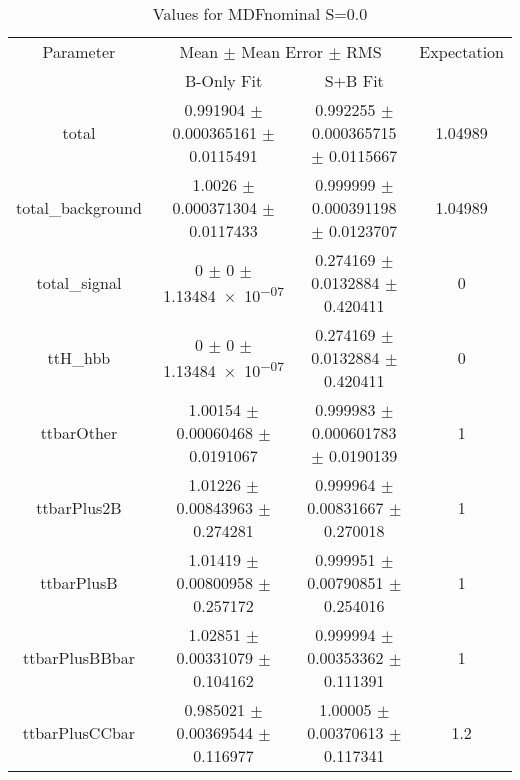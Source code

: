 \begin{table}
\centering
\caption{Values for MDFnominal S=0.0}
\begin{tabular}{cccc}
\toprule
Parameter & \multicolumn{2}{c}{Mean $\pm$ Mean Error $\pm$ RMS} & Expectation\\
 & B-Only Fit & S+B Fit & \\
\midrule
total & \num{0.991904} $\pm$ \num{0.000365161} $\pm$ \num{0.0115491} & \num{0.992255} $\pm$ \num{0.000365715} $\pm$ \num{0.0115667} & \num{1.04989}\\
total\_background & \num{1.0026} $\pm$ \num{0.000371304} $\pm$ \num{0.0117433} & \num{0.999999} $\pm$ \num{0.000391198} $\pm$ \num{0.0123707} & \num{1.04989}\\
total\_signal & \num{0} $\pm$ \num{0} $\pm$ \num{1.13484e-07} & \num{0.274169} $\pm$ \num{0.0132884} $\pm$ \num{0.420411} & \num{0}\\
ttH\_hbb & \num{0} $\pm$ \num{0} $\pm$ \num{1.13484e-07} & \num{0.274169} $\pm$ \num{0.0132884} $\pm$ \num{0.420411} & \num{0}\\
ttbarOther & \num{1.00154} $\pm$ \num{0.00060468} $\pm$ \num{0.0191067} & \num{0.999983} $\pm$ \num{0.000601783} $\pm$ \num{0.0190139} & \num{1}\\
ttbarPlus2B & \num{1.01226} $\pm$ \num{0.00843963} $\pm$ \num{0.274281} & \num{0.999964} $\pm$ \num{0.00831667} $\pm$ \num{0.270018} & \num{1}\\
ttbarPlusB & \num{1.01419} $\pm$ \num{0.00800958} $\pm$ \num{0.257172} & \num{0.999951} $\pm$ \num{0.00790851} $\pm$ \num{0.254016} & \num{1}\\
ttbarPlusBBbar & \num{1.02851} $\pm$ \num{0.00331079} $\pm$ \num{0.104162} & \num{0.999994} $\pm$ \num{0.00353362} $\pm$ \num{0.111391} & \num{1}\\
ttbarPlusCCbar & \num{0.985021} $\pm$ \num{0.00369544} $\pm$ \num{0.116977} & \num{1.00005} $\pm$ \num{0.00370613} $\pm$ \num{0.117341} & \num{1.2}\\
\bottomrule
\end{tabular}
\end{table}